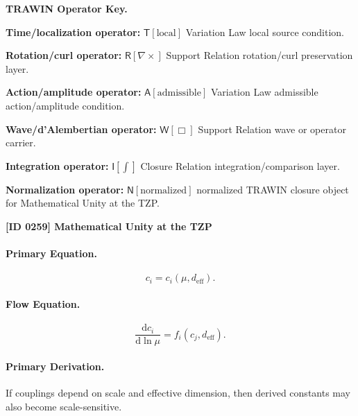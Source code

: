 \par\vspace{0.45\baselineskip}
\noindent\begin{minipage}[t]{\linewidth}
\begingroup
\small
\raggedright
\textbf{TRAWIN Operator Key.}\par
\noindent\textbf{Time/localization operator:} $\mathsf{T}\!\left[\mathrm{local}\right]$ Variation Law local source condition.\par
\noindent\textbf{Rotation/curl operator:} $\mathsf{R}\!\left[\nabla\times\right]$ Support Relation rotation/curl preservation layer.\par
\noindent\textbf{Action/amplitude operator:} $\mathsf{A}\!\left[\mathrm{admissible}\right]$ Variation Law admissible action/amplitude condition.\par
\noindent\textbf{Wave/d'Alembertian operator:} $\mathsf{W}\!\left[\Box\right]$ Support Relation wave or operator carrier.\par
\noindent\textbf{Integration operator:} $\mathsf{I}\!\left[\int\right]$ Closure Relation integration/comparison layer.\par
\noindent\textbf{Normalization operator:} $\mathsf{N}\!\left[\mathrm{normalized}\right]$ normalized TRAWIN closure object for Mathematical Unity at the TZP.\par
\endgroup
\end{minipage}

\clearpage
\noindent\textbf{[ID 0259] Mathematical Unity at the TZP}\par
\vspace{0.35em}
\paragraph{Primary Equation.}
\begin{equation}
c_i=c_i(\mu,d_{\mathrm{eff}}).
\end{equation}

\paragraph{Flow Equation.}
\begin{equation}
\frac{\mathrm{d}c_i}{\mathrm{d}\ln\mu}
=
f_i(c_j,d_{\mathrm{eff}}).
\end{equation}

\paragraph{Primary Derivation.}
If couplings depend on scale and effective dimension, then derived constants may also become scale-sensitive.

